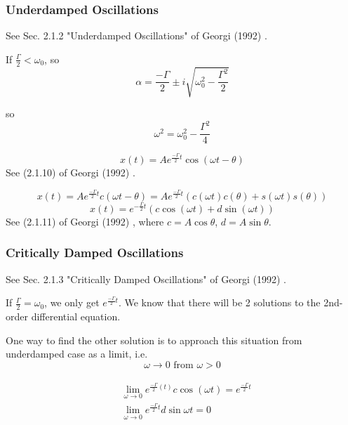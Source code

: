 \subsubsection{Underdamped Oscillations} See Sec. 2.1.2 "Underdamped Oscillations" of Georgi (1992) \cite{agat:Geor1992}.

If $\frac{\Gamma}{2} < \omega_0$, so
\[
\alpha = \frac{-\Gamma }{2} \pm i \sqrt{ \omega_0^2 - \frac{\Gamma^2}{2} } 
\]

so 
\begin{equation}
	\omega^2 = \omega_0^2 - \frac{ \Gamma^2}{4}
\end{equation}

\begin{equation}
	x(t) = Ae^{\frac{-\Gamma}{2} t} \cos{ (\omega t- \theta)}
\end{equation}
See (2.1.10) of Georgi (1992) \cite{agat:Geor1992}.

\[
x(t) = A e^{\frac{-\Gamma}{2} t} c(\omega t - \theta) = Ae^{\frac{-\Gamma}{2}t } (c(\omega t) c(\theta) + s(\omega t) s(\theta))
\]
\begin{equation}\label{agat:Eq:UnderdampedOscillationsSolution:2}
	x(t) = e^{-\frac{\Gamma}{2}t} (c \cos{(\omega t)} + d\sin{(\omega t)})
\end{equation}
See (2.1.11) of Georgi (1992) \cite{agat:Geor1992}, where $c= A\cos{\theta}$, $d=A\sin{\theta}$.

\subsubsection{Critically Damped Oscillations} See Sec. 2.1.3 "Critically Damped Oscillations" of Georgi (1992) \cite{agat:Geor1992}.

If $\frac{\Gamma}{2} = \omega_0$, we only get $e^{\frac{-\Gamma}{2} t}$. We know that there will be 2 solutions to the 2nd-order differential equation.

One way to find the other solution is to approach this situation from underdamped case as a limit, i.e.
\[
\omega \to 0 \text{ from } \omega > 0
\]

\[
\begin{gathered}
	\begin{aligned}
		& \lim_{\omega \to 0} e^{ \frac{-\Gamma}{2}(t) } c\cos{(\omega t)} = e^{ \frac{-\Gamma}{2} t} \\
		& \lim_{\omega\to 0} e^{\frac{-\Gamma}{2} t} d \sin{\omega t} = 0
	\end{aligned}
\end{gathered}
\]

